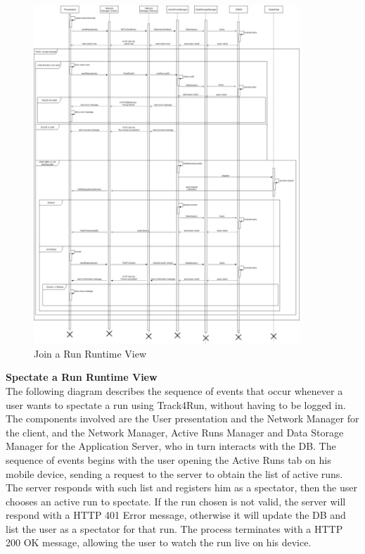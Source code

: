 \documentclass[titlepage]{article}
\begin{document}
\begin{figure}[H]
	\center
  	\includegraphics[width=10cm]{Join.png} %
  	\caption{Join a Run Runtime View}
 	\label{fig:JOIN}
\end{figure}


{\bf Spectate a Run Runtime View }\\ 
The following diagram describes the sequence of events that occur whenever a user wants to spectate a run using Track4Run, without having to be logged in.
The components involved are the User presentation and the Network Manager for the client, and the Network Manager, Active Runs Manager and Data Storage Manager for the Application Server, who in turn interacts with the DB.
The sequence of events begins with the user opening the Active Runs tab on his mobile device, sending a request to the server to obtain the list of active runs. The server responds with such list and registers him as a spectator, then the user chooses an active run to spectate. If the run chosen is not valid, the server will respond with a HTTP 401 Error message, otherwise it will update the DB and list the user as a spectator for that run. The process terminates with a HTTP 200 OK message, allowing the user to watch the run live on his device.
\end{document}

